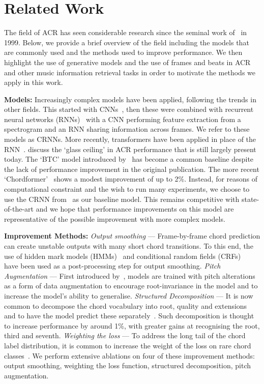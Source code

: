\section{Related Work}\label{sec:related-work}

The field of ACR has seen considerable research since the seminal work of~\cite{FujishimaACR} in 1999. Below, we provide a brief overview of the field including the models that are commonly used and the methods used to improve performance. We then highlight the use of generative models and the use of frames and beats in ACR and other music information retrieval tasks in order to motivate the methods we apply in this work.

\textbf{Models:} Increasingly complex models have been applied, following the trends in other fields. This started with CNNs~\cite{RethinkingChordRecognition}, then these were combined with recurrent neural networks (RNNs)~\cite{firstrnn, ACRCNNRNN1,ACRLargeVocab1,StructuredTraining} with a CNN performing feature extraction from a spectrogram and an RNN sharing information across frames. We refer to these models as CRNNs. More recently, transformers have been applied in place of the RNN~\cite{MelodyTranscriptionViaGenerativePreTraining, HarmonyTransformer, AttendToChords,CurriculumLearning,BTC,discordharmony,chordformer}. \cite{FourTimelyInsights} discuss the `glass ceiling' in ACR performance that is still largely present today. The `BTC' model introduced by~\cite{BTC} has become a common baseline despite the lack of performance improvement in the original publication. The more recent `Chordformer'~\cite{chordformer} shows a modest improvement of up to 2\%. Instead, for reasons of computational constraint and the wish to run many experiments, we choose to use the CRNN from~\cite{StructuredTraining} as our baseline model. This remains competitive with state-of-the-art and we hope that performance improvements on this model are representative of the possible improvement with more complex models.

\textbf{Improvement Methods:} \emph{Output smoothing} — Frame-by-frame chord prediction can create unstable outputs with many short chord transitions. To this end, the use of hidden mark models (HMMs)~\cite{BalanceRandomForestACR} and conditional random fields (CRFs)~\cite{ACRLargeVocab1} have been used as a post-processing step for output smoothing. \emph{Pitch Augmentation} — First introduced by~\cite{StructuredTraining}, models are trained with pitch alterations as a form of data augmentation to encourage root-invariance in the model and to increase the model's ability to generalise. \emph{Structured Decomposition} — It is now common to decompose the chord vocabulary into root, quality and extensions and to have the model predict these separately~\cite{StructuredTraining, ACRLargeVocab1}. Such decomposition is thought to increase performance by around 1\%, with greater gains at recognising the root, third and seventh. \emph{Weighting the loss} — To address the long tail of the chord label distribution, it is common to increase the weight of the loss on rare chord classes~\cite{ACRLargeVocab1}. We perform extensive ablations on four of these improvement methods: output smoothing, weighting the loss function, structured decomposition, pitch augmentation. 

